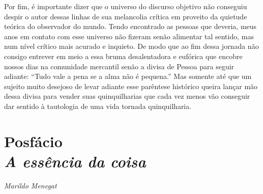 Por fim, é importante dizer que o universo do discurso objetivo não
conseguiu despir o autor dessas linhas de sua melancolia crítica em
proveito da quietude teórica do observador do mundo. Tendo encontrado as
pessoas que deveria, meus anos em contato com esse universo não fizeram
senão alimentar tal sentido, mas num nível crítico mais acurado e
inquieto. De modo que ao fim dessa jornada não consigo entrever em meio
a essa bruma desalentadora e eufórica que encobre nossos dias na
comunidade mercantil senão a divisa de Pessoa para seguir adiante:
``Tudo vale a pena se a alma não é pequena.'' Mas somente até que um
sujeito muito desejoso de levar adiante esse parêntese histórico queira
lançar mão dessa divisa para vender suas quinquilharias que cada vez
menos vão conseguir dar sentido à tautologia de uma vida tornada
quinquilharia.

\chapter*{Posfácio\\\emph{A essência da coisa}}

\begin{flushright}
\emph{Marildo Menegat}
\end{flushright}

